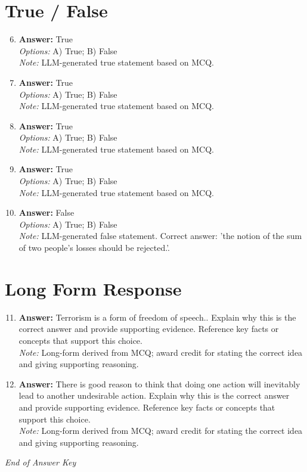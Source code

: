\documentclass[12pt]{article}
\begin{document}
\section*{True / False}
\begin{enumerate}[label=\arabic*.]
\setcounter{enumi}{5}
\item \textbf{Answer:} True
\\ \textit{Options:} A) True; B) False
\\ \textit{Note:} LLM-generated true statement based on MCQ.
\item \textbf{Answer:} True
\\ \textit{Options:} A) True; B) False
\\ \textit{Note:} LLM-generated true statement based on MCQ.
\item \textbf{Answer:} True
\\ \textit{Options:} A) True; B) False
\\ \textit{Note:} LLM-generated true statement based on MCQ.
\item \textbf{Answer:} True
\\ \textit{Options:} A) True; B) False
\\ \textit{Note:} LLM-generated true statement based on MCQ.
\item \textbf{Answer:} False
\\ \textit{Options:} A) True; B) False
\\ \textit{Note:} LLM-generated false statement. Correct answer: 'the notion of the sum of two people's losses should be rejected.'.
\end{enumerate}

\section*{Long Form Response}
\begin{enumerate}[label=\arabic*.]
\setcounter{enumi}{10}
\item \textbf{Answer:} Terrorism is a form of freedom of speech.. Explain why this is the correct answer and provide supporting evidence. Reference key facts or concepts that support this choice.
\\ \textit{Note:} Long-form derived from MCQ; award credit for stating the correct idea and giving supporting reasoning.
\item \textbf{Answer:} There is good reason to think that doing one action will inevitably lead to another undesirable action. Explain why this is the correct answer and provide supporting evidence. Reference key facts or concepts that support this choice.
\\ \textit{Note:} Long-form derived from MCQ; award credit for stating the correct idea and giving supporting reasoning.
\end{enumerate}

\vfill
\noindent\textit{End of Answer Key}
\end{document}

